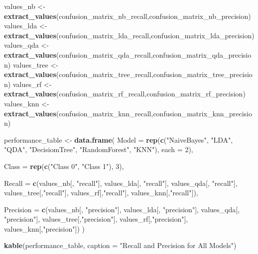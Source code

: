 \documentclass[
]{article}
\newenvironment{Shaded}{\begin{snugshade}}{\end{snugshade}}
\newcommand{\AttributeTok}[1]{\textcolor[rgb]{0.13,0.29,0.53}{#1}}
\newcommand{\DecValTok}[1]{\textcolor[rgb]{0.00,0.00,0.81}{#1}}
\newcommand{\FunctionTok}[1]{\textcolor[rgb]{0.13,0.29,0.53}{\textbf{#1}}}
\newcommand{\NormalTok}[1]{#1}
\newcommand{\OtherTok}[1]{\textcolor[rgb]{0.56,0.35,0.01}{#1}}
\newcommand{\StringTok}[1]{\textcolor[rgb]{0.31,0.60,0.02}{#1}}
\begin{document}
\begin{Shaded}
\begin{Highlighting}[]
\NormalTok{values\_nb }\OtherTok{\textless{}{-}} \FunctionTok{extract\_values}\NormalTok{(confusion\_matrix\_nb\_recall,confusion\_matrix\_nb\_precision)}
\NormalTok{values\_lda }\OtherTok{\textless{}{-}} \FunctionTok{extract\_values}\NormalTok{(confusion\_matrix\_lda\_recall,confusion\_matrix\_lda\_precision)}
\NormalTok{values\_qda }\OtherTok{\textless{}{-}} \FunctionTok{extract\_values}\NormalTok{(confusion\_matrix\_qda\_recall,confusion\_matrix\_qda\_precision)}
\NormalTok{values\_tree }\OtherTok{\textless{}{-}} \FunctionTok{extract\_values}\NormalTok{(confusion\_matrix\_tree\_recall,confusion\_matrix\_tree\_precision)}
\NormalTok{values\_rf }\OtherTok{\textless{}{-}} \FunctionTok{extract\_values}\NormalTok{(confusion\_matrix\_rf\_recall,confusion\_matrix\_rf\_precision)}
\NormalTok{values\_knn }\OtherTok{\textless{}{-}} \FunctionTok{extract\_values}\NormalTok{(confusion\_matrix\_knn\_recall,confusion\_matrix\_knn\_precision)}


\NormalTok{performance\_table }\OtherTok{\textless{}{-}} \FunctionTok{data.frame}\NormalTok{(}
  \AttributeTok{Model =} \FunctionTok{rep}\NormalTok{(}\FunctionTok{c}\NormalTok{(}\StringTok{"NaiveBayes"}\NormalTok{, }
                \StringTok{"LDA"}\NormalTok{, }
                \StringTok{"QDA"}\NormalTok{,}
                \StringTok{"DecisiomTree"}\NormalTok{,}
                \StringTok{"RandomForest"}\NormalTok{,}
                \StringTok{"KNN"}\NormalTok{), }\AttributeTok{each =} \DecValTok{2}\NormalTok{),}
  
  \AttributeTok{Class =} \FunctionTok{rep}\NormalTok{(}\FunctionTok{c}\NormalTok{(}\StringTok{"Class 0"}\NormalTok{, }\StringTok{"Class 1"}\NormalTok{), }\DecValTok{3}\NormalTok{),}
  
  \AttributeTok{Recall =} \FunctionTok{c}\NormalTok{(values\_nb[, }\StringTok{"recall"}\NormalTok{],}
\NormalTok{             values\_lda[, }\StringTok{"recall"}\NormalTok{],}
\NormalTok{             values\_qda[, }\StringTok{"recall"}\NormalTok{],}
\NormalTok{             values\_tree[,}\StringTok{"recall"}\NormalTok{],}
\NormalTok{             values\_rf[,}\StringTok{"recall"}\NormalTok{],}
\NormalTok{             values\_knn[,}\StringTok{"recall"}\NormalTok{]),}
  
  \AttributeTok{Precision =} \FunctionTok{c}\NormalTok{(values\_nb[, }\StringTok{"precision"}\NormalTok{], }
\NormalTok{                values\_lda[, }\StringTok{"precision"}\NormalTok{],}
\NormalTok{                values\_qda[, }\StringTok{"precision"}\NormalTok{],}
\NormalTok{                values\_tree[,}\StringTok{"precision"}\NormalTok{],}
\NormalTok{                values\_rf[,}\StringTok{"precision"}\NormalTok{],}
\NormalTok{                values\_knn[,}\StringTok{"precision"}\NormalTok{])}
\NormalTok{)}



\FunctionTok{kable}\NormalTok{(performance\_table, }\AttributeTok{caption =} \StringTok{"Recall and Precision for All Models"}\NormalTok{)}
\end{Highlighting}
\end{Shaded}
\end{document}
